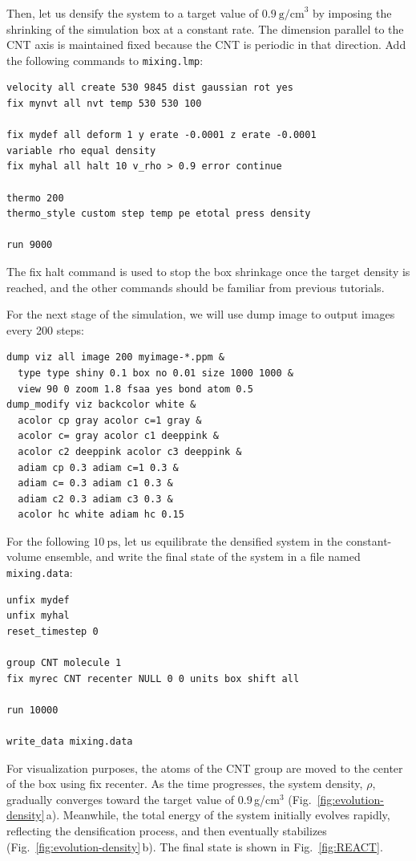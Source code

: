 \documentclass[9pt,tutorial]{livecoms}
\newcommand{\lmpcmd}[1]{\colorbox{listing}{\textcolor{command}{\small{#1}}}} %
\newcommand{\flecmd}[1]{\textcolor{command}{\texttt{#1}}} %
\begin{document}
Then, let us densify the system to a target value of $0.9~\text{g/cm}^3$
by imposing the shrinking of the simulation box at a constant rate.
The dimension parallel to the CNT axis is maintained fixed because the CNT is periodic in that direction.
Add the following commands to \flecmd{mixing.lmp}:
\begin{lstlisting}
velocity all create 530 9845 dist gaussian rot yes
fix mynvt all nvt temp 530 530 100

fix mydef all deform 1 y erate -0.0001 z erate -0.0001
variable rho equal density
fix myhal all halt 10 v_rho > 0.9 error continue

thermo 200
thermo_style custom step temp pe etotal press density

run 9000
\end{lstlisting}
The \lmpcmd{fix halt} command is used to stop the box shrinkage once the
target density is reached, and the other commands should be
familiar from previous tutorials.

For the next stage of the simulation, we will use \lmpcmd{dump image} to
output images every 200 steps:
\begin{lstlisting}
dump viz all image 200 myimage-*.ppm &
  type type shiny 0.1 box no 0.01 size 1000 1000 &
  view 90 0 zoom 1.8 fsaa yes bond atom 0.5
dump_modify viz backcolor white &
  acolor cp gray acolor c=1 gray &
  acolor c= gray acolor c1 deeppink &
  acolor c2 deeppink acolor c3 deeppink &
  adiam cp 0.3 adiam c=1 0.3 &
  adiam c= 0.3 adiam c1 0.3 &
  adiam c2 0.3 adiam c3 0.3 &
  acolor hc white adiam hc 0.15
\end{lstlisting}
For the following $10~\text{ps}$, let us equilibrate the densified system
in the constant-volume ensemble, and write the final state of the
system in a file named \flecmd{mixing.data}:
\begin{lstlisting}
unfix mydef
unfix myhal
reset_timestep 0

group CNT molecule 1
fix myrec CNT recenter NULL 0 0 units box shift all

run 10000

write_data mixing.data
\end{lstlisting}
For visualization purposes, the atoms of the CNT \lmpcmd{group} are moved
to the center of the box using \lmpcmd{fix recenter}. As the time progresses, the system density,
$\rho$, gradually converges toward the target value of $0.9$\,g/cm$^3$ (Fig.~\ref{fig:evolution-density}\,a).
Meanwhile, the total energy of the system initially evolves rapidly, reflecting the
densification process, and then eventually stabilizes (Fig.~\ref{fig:evolution-density}\,b).
The final state is shown in Fig.~\ref{fig:REACT}.
\end{document}
